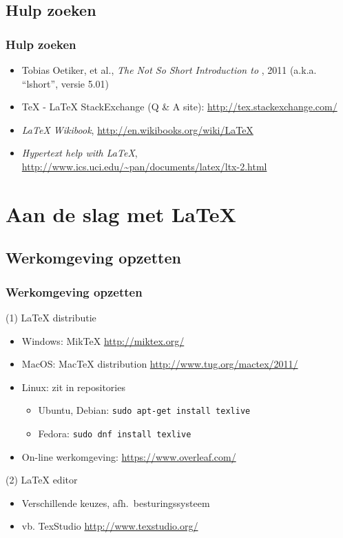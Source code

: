 \documentclass{beamer}
\begin{document}
\subsection{Hulp zoeken}

\begin{frame}
  \frametitle{Hulp zoeken}

  \begin{itemize}
  \item Tobias Oetiker, et al., \emph{The Not So Short Introduction to {\LaTeXe}}, 2011 (a.k.a. ``lshort'', versie 5.01)
  \item {\TeX} - {\LaTeX} StackExchange (Q \& A site): \url{http://tex.stackexchange.com/}
  \item \emph{{\LaTeX} Wikibook}, \url{http://en.wikibooks.org/wiki/LaTeX}
  \item \emph{Hypertext help with {\LaTeX}}, \url{http://www.ics.uci.edu/~pan/documents/latex/ltx-2.html}
  \end{itemize}

\end{frame}

\section{Aan de slag met {\LaTeX}}

\subsection{Werkomgeving opzetten}

\begin{frame}
  \frametitle{Werkomgeving opzetten}

(1) {\LaTeX} distributie
  
  \begin{itemize}
  \item Windows: MikTeX \url{http://miktex.org/}
  \item MacOS: MacTeX distribution \url{http://www.tug.org/mactex/2011/}
  \item Linux: zit in repositories
    \begin{itemize}
    \item Ubuntu, Debian: \texttt{sudo apt-get install texlive}
    \item Fedora: \texttt{sudo dnf install texlive}
    \end{itemize}
  \item On-line werkomgeving: \url{https://www.overleaf.com/}
  \end{itemize}

(2) {\LaTeX} editor

  \begin{itemize}
  \item Verschillende keuzes, afh.~besturingssysteem
  \item vb. TexStudio \url{http://www.texstudio.org/}
  \end{itemize}
\end{frame}
\end{document}

